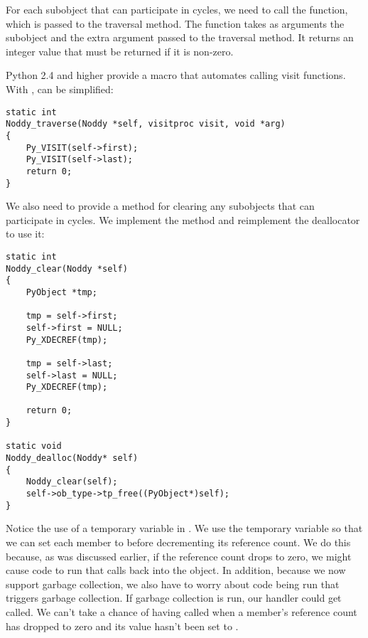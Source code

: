 For each subobject that can participate in cycles, we need to call the
 function, which is passed to the traversal method.
The  function takes as arguments the subobject and
the extra argument  passed to the traversal method.  It
returns an integer value that must be returned if it is non-zero.


Python 2.4 and higher provide a  macro that automates
calling visit functions.  With ,
 can be simplified:


\begin{verbatim}
static int
Noddy_traverse(Noddy *self, visitproc visit, void *arg)
{
    Py_VISIT(self->first);
    Py_VISIT(self->last);
    return 0;
}
\end{verbatim}


We also need to provide a method for clearing any subobjects that can
participate in cycles.  We implement the method and reimplement the
deallocator to use it:

\begin{verbatim}
static int
Noddy_clear(Noddy *self)
{
    PyObject *tmp;

    tmp = self->first;
    self->first = NULL;
    Py_XDECREF(tmp);

    tmp = self->last;
    self->last = NULL;
    Py_XDECREF(tmp);

    return 0;
}

static void
Noddy_dealloc(Noddy* self)
{
    Noddy_clear(self);
    self->ob_type->tp_free((PyObject*)self);
}
\end{verbatim}

Notice the use of a temporary variable in .
We use the temporary variable so that we can set each member to \NULL{}
before decrementing its reference count.  We do this because, as was
discussed earlier, if the reference count drops to zero, we might
cause code to run that calls back into the object.  In addition,
because we now support garbage collection, we also have to worry about
code being run that triggers garbage collection.  If garbage
collection is run, our  handler could get called.
We can't take a chance of having  called
when a member's reference count has dropped to zero and its value
hasn't been set to \NULL.

